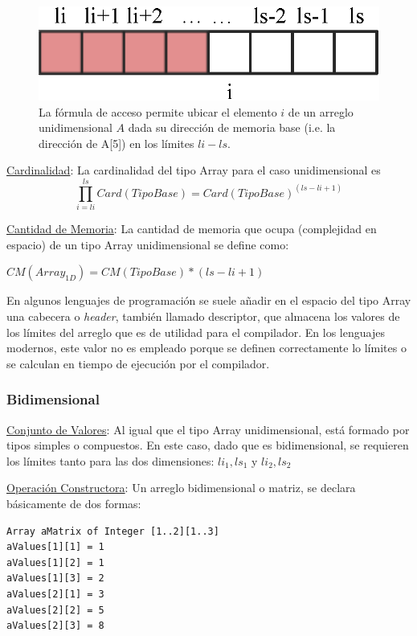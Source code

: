 \begin{figure}[!htb]
\centering
\includegraphics[scale=.7]{images/arreglo.eps}
\caption{La fórmula de acceso permite ubicar el elemento $i$ de un arreglo unidimensional $A$ dada su dirección de memoria base (i.e. la dirección de A[5]) en los límites $li-ls$.}
\label{fig:array}
\end{figure}

\underline{Cardinalidad}: La cardinalidad del tipo Array para el caso unidimensional es $$\prod_{i=li}^{ls}{Card(TipoBase)} = Card(TipoBase)^{(ls-li+1)}$$

\underline{Cantidad de Memoria}: La cantidad de memoria que ocupa (complejidad en espacio) de un tipo Array unidimensional se define como:

$CM(Array_{1D}) = CM(TipoBase) * (ls - li + 1)$

En algunos lenguajes de programación se suele añadir en el espacio del tipo Array una cabecera o \textit{header}, también llamado descriptor, que almacena los valores de los límites del arreglo que es de utilidad para el compilador. En los lenguajes modernos, este valor no es empleado porque se definen correctamente lo límites o se calculan en tiempo de ejecución por el compilador.

\subsubsection{Bidimensional}

\underline{Conjunto de Valores}: Al igual que el tipo Array unidimensional, está formado por tipos simples o compuestos. En este caso, dado que es bidimensional, se requieren los límites tanto para las dos dimensiones: $li_1, ls_1$ y $li_2, ls_2$

\underline{Operación Constructora}: Un arreglo bidimensional o matriz, se declara básicamente de dos formas:

\begin{lstlisting}[upquote=true, language=pseudo]
Array aMatrix of Integer [1..2][1..3]
aValues[1][1] = 1
aValues[1][2] = 1
aValues[1][3] = 2
aValues[2][1] = 3
aValues[2][2] = 5
aValues[2][3] = 8
\end{lstlisting}

